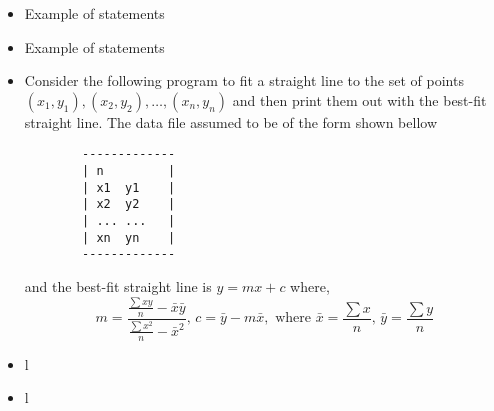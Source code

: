 \documentclass[class=book,crop=false]{standalone}
\begin{document}
\begin{itemize}
    \item Example of  statements\newpage
    \item Example of  statements\newpage
    \item Consider the following program to fit a straight line to the set of points $ (x_1, y_1), (x_2, y_2),\dots,(x_n, y_n) $ and then print them out with the best-fit straight line. The data file assumed to be of the form shown bellow 
    \begin{verbatim}
        -------------
        | n         |
        | x1  y1    |
        | x2  y2    |
        | ... ...   |
        | xn  yn    |
        -------------
    \end{verbatim}
    and the best-fit straight line is $ y=mx+c $ where,
    $$ m=\frac{\frac{\sum xy}{n}-\bar{x}\bar{y}}{\frac{\sum x^2}{n}-\bar{x}^2},\, c=\bar{y}-m\bar{x}, \text{ where } \bar{x}=\frac{\sum x}{n},\, \bar{y}=\frac{\sum y}{n}$$
    
    \item l
    \item l
\end{itemize}
\end{document}
